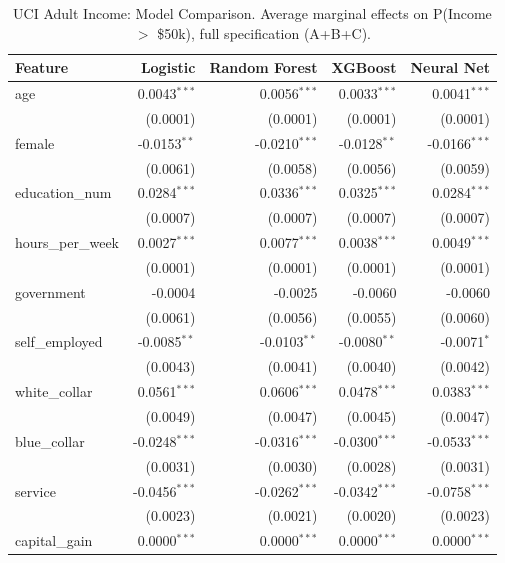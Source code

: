 \documentclass[12pt]{article}
\begin{document}
	\begin{table}[htbp]
		\centering
		\small
		\begin{threeparttable}
			\caption{UCI Adult Income: Model Comparison. Average marginal effects on P(Income $>$ \$50k), full specification (A+B+C).}
			\label{tab:adult_model_comparison}
			\begin{tabular}{lrrrr}
				\toprule
				Feature & Logistic & Random Forest & XGBoost & Neural Net \\
				\midrule
				age & 0.0043$^{***}$ & 0.0056$^{***}$ & 0.0033$^{***}$ & 0.0041$^{***}$ \\
				& (0.0001) & (0.0001) & (0.0001) & (0.0001) \\
				female & -0.0153$^{**}$ & -0.0210$^{***}$ & -0.0128$^{**}$ & -0.0166$^{***}$ \\
				& (0.0061) & (0.0058) & (0.0056) & (0.0059) \\
				education\_num & 0.0284$^{***}$ & 0.0336$^{***}$ & 0.0325$^{***}$ & 0.0284$^{***}$ \\
				& (0.0007) & (0.0007) & (0.0007) & (0.0007) \\
				\midrule
				hours\_per\_week & 0.0027$^{***}$ & 0.0077$^{***}$ & 0.0038$^{***}$ & 0.0049$^{***}$ \\
				& (0.0001) & (0.0001) & (0.0001) & (0.0001) \\
				government & -0.0004 & -0.0025 & -0.0060 & -0.0060 \\
				& (0.0061) & (0.0056) & (0.0055) & (0.0060) \\
				self\_employed & -0.0085$^{**}$ & -0.0103$^{**}$ & -0.0080$^{**}$ & -0.0071$^{*}$ \\
				& (0.0043) & (0.0041) & (0.0040) & (0.0042) \\
				white\_collar & 0.0561$^{***}$ & 0.0606$^{***}$ & 0.0478$^{***}$ & 0.0383$^{***}$ \\
				& (0.0049) & (0.0047) & (0.0045) & (0.0047) \\
				blue\_collar & -0.0248$^{***}$ & -0.0316$^{***}$ & -0.0300$^{***}$ & -0.0533$^{***}$ \\
				& (0.0031) & (0.0030) & (0.0028) & (0.0031) \\
				service & -0.0456$^{***}$ & -0.0262$^{***}$ & -0.0342$^{***}$ & -0.0758$^{***}$ \\
				& (0.0023) & (0.0021) & (0.0020) & (0.0023) \\
				\midrule
				capital\_gain & 0.0000$^{***}$ & 0.0000$^{***}$ & 0.0000$^{***}$ & 0.0000$^{***}$ \\

\end{tabular}
\end{threeparttable}
\end{table}
\end{document}

